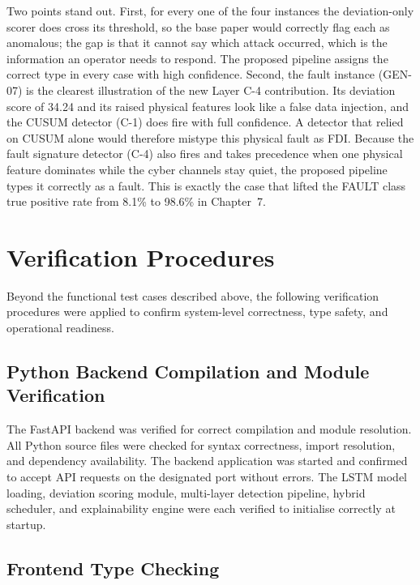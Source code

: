 \noindent
Two points stand out. First, for every one of the four instances the deviation-only scorer does cross its threshold, so the base paper would correctly flag each as anomalous; the gap is that it cannot say which attack occurred, which is the information an operator needs to respond. The proposed pipeline assigns the correct type in every case with high confidence. Second, the fault instance (GEN-07) is the clearest illustration of the new Layer C-4 contribution. Its deviation score of 34.24 and its raised physical features look like a false data injection, and the CUSUM detector (C-1) does fire with full confidence. A detector that relied on CUSUM alone would therefore mistype this physical fault as FDI. Because the fault signature detector (C-4) also fires and takes precedence when one physical feature dominates while the cyber channels stay quiet, the proposed pipeline types it correctly as a fault. This is exactly the case that lifted the FAULT class true positive rate from 8.1\% to 98.6\% in Chapter~7.

\par \vspace{0.35cm}

\section{Verification Procedures}

Beyond the functional test cases described above, the following verification procedures were applied to confirm system-level correctness, type safety, and operational readiness.

\subsection{Python Backend Compilation and Module Verification}

The FastAPI backend was verified for correct compilation and module resolution. All Python source files were checked for syntax correctness, import resolution, and dependency availability. The backend application was started and confirmed to accept API requests on the designated port without errors. The LSTM model loading, deviation scoring module, multi-layer detection pipeline, hybrid scheduler, and explainability engine were each verified to initialise correctly at startup.

\subsection{Frontend Type Checking}

